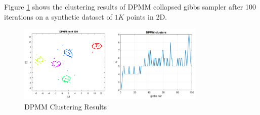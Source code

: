 Figure \ref{fig:dp_results} shows the clustering results of DPMM collapsed gibbs sampler after 100 iterations on a synthetic dataset of $1K$ points in 2D.
\begin{figure}[thpb]
    \centering
    \includegraphics[width=0.8\textwidth, trim={10 10 10 10}]{figures/dp_results.png}
    \caption{DPMM Clustering Results}
    \label{fig:dp_results}
\end{figure}
